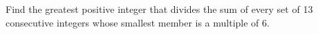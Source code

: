 Find the greatest positive integer that divides the sum of every set of 13 consecutive integers whose smallest member is a multiple of 6.
